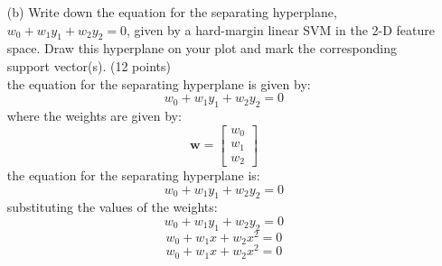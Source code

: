 \documentclass[a3paper,12pt]{article} %
\begin{document}
\begin{enumerate}
    \item[(b)] Write down the equation for the separating hyperplane, 
    \(
    w_0 + w_1y_1 + w_2y_2 = 0
    \),
    given by a hard-margin linear SVM in the 2-D feature space. Draw this hyperplane on your plot and mark the corresponding support vector(s). \hfill (12 points)
    \\ the equation for the separating hyperplane is given by:
    \[
    w_0 + w_1y_1 + w_2y_2 = 0
    \]
    where the weights are given by:
    \[
    \mathbf{w} = \begin{bmatrix}
    w_0 \\
    w_1 \\
    w_2
    \end{bmatrix}
    \]
    the equation for the separating hyperplane is:
    \[
    w_0 + w_1y_1 + w_2y_2 = 0
    \]
    substituting the values of the weights:
    \[
    w_0 + w_1y_1 + w_2y_2 = 0
    \]
    \[
    w_0 + w_1x + w_2x^2 = 0
    \]
    \[
    w_0 + w_1x + w_2x^2 = 0
    \]
\end{enumerate}
\end{document}
